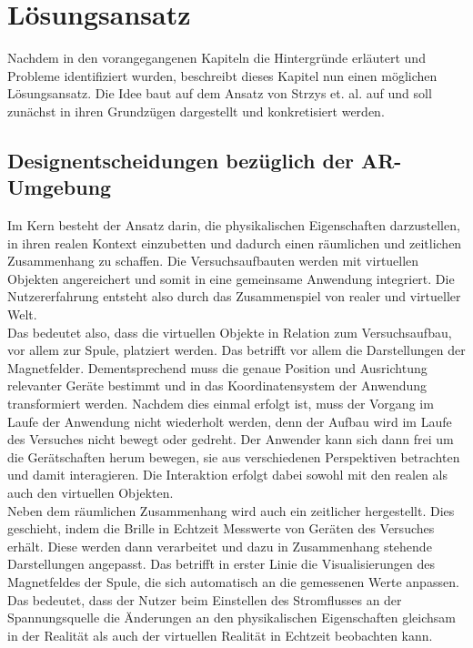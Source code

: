 \section{Lösungsansatz}
\label{sec-4}

Nachdem in den vorangegangenen Kapiteln die Hintergründe erläutert und Probleme identifiziert wurden, beschreibt dieses Kapitel nun einen möglichen Lösungsansatz. Die Idee baut auf dem Ansatz von Strzys et. al. auf und soll zunächst in ihren Grundzügen dargestellt und konkretisiert werden.

\subsection{Designentscheidungen bezüglich der AR-Umgebung}
\label{sec-4-1}
Im Kern besteht der Ansatz darin, die physikalischen Eigenschaften darzustellen, in ihren realen Kontext einzubetten und dadurch einen räumlichen und zeitlichen Zusammenhang zu schaffen. Die Versuchsaufbauten werden mit virtuellen Objekten angereichert und somit in eine gemeinsame Anwendung integriert. Die Nutzererfahrung entsteht also durch das Zusammenspiel von realer und virtueller Welt.\\

Das bedeutet also, dass die virtuellen Objekte in Relation zum Versuchsaufbau, vor allem zur Spule, platziert werden. Das betrifft vor allem die Darstellungen der Magnetfelder. Dementsprechend muss die genaue Position und Ausrichtung relevanter Geräte bestimmt und in das Koordinatensystem der Anwendung transformiert werden. Nachdem dies einmal erfolgt ist, muss der Vorgang im Laufe der Anwendung nicht wiederholt werden, denn der Aufbau wird im Laufe des Versuches nicht bewegt oder gedreht. Der Anwender kann sich dann frei um die Gerätschaften herum bewegen, sie aus verschiedenen Perspektiven betrachten und damit interagieren. Die Interaktion erfolgt dabei sowohl mit den realen als auch den virtuellen Objekten.\\

Neben dem räumlichen Zusammenhang wird auch ein zeitlicher hergestellt. Dies geschieht, indem die Brille in Echtzeit Messwerte von Geräten des Versuches erhält. Diese werden dann verarbeitet und dazu in Zusammenhang stehende Darstellungen angepasst. Das betrifft in erster Linie die Visualisierungen des Magnetfeldes der Spule, die sich automatisch an die gemessenen Werte anpassen. Das bedeutet, dass der Nutzer beim Einstellen des Stromflusses an der Spannungsquelle die Änderungen an den physikalischen Eigenschaften gleichsam in der Realität als auch der virtuellen Realität in Echtzeit beobachten kann. \\

